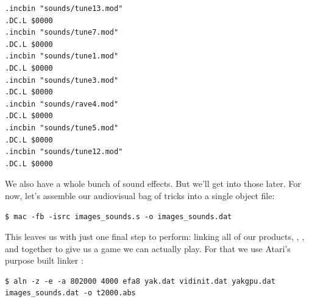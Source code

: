 \begin{lstlisting}
.incbin "sounds/tune13.mod"
.DC.L $0000
.incbin "sounds/tune7.mod"
.DC.L $0000
.incbin "sounds/tune1.mod"
.DC.L $0000
.incbin "sounds/tune3.mod"
.DC.L $0000
.incbin "sounds/rave4.mod"
.DC.L $0000
.incbin "sounds/tune5.mod"
.DC.L $0000
.incbin "sounds/tune12.mod"
.DC.L $0000
\end{lstlisting}

We also have a whole bunch of sound effects. But we'll get into those later. For now, let's assemble
our audiovisual bag of tricks into a single object file:
\begin{lstlisting}
$ mac -fb -isrc images_sounds.s -o images_sounds.dat
\end{lstlisting}

This leaves us with just one final step to perform: linking all of our products, , ,
and  together to give us a game we can actually play. For that we use Atari's purpose built 
linker :

\begin{lstlisting}
$ aln -z -e -a 802000 4000 efa8 yak.dat vidinit.dat yakgpu.dat images_sounds.dat -o t2000.abs
\end{lstlisting}


